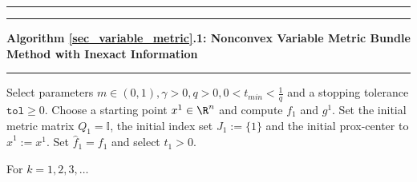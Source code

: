 \begin{minipage}\linewidth
\vspace{1em}
\hrule  \vspace{0.4ex} \hrule
\vspace{1ex}
\textbf{Algorithm \ref{sec_variable_metric}.1: Nonconvex Variable Metric Bundle Method with Inexact Information}
\vspace{1ex}
\hrule
\vspace{1ex}
Select parameters \( m \in (0,1), \gamma > 0, q > 0, 0 < t_{min} < \frac{1}{q} \) and a stopping tolerance \( \mathtt{tol} \geq 0\). Choose a starting point \(x^1 \in \R^n\) and compute \(f_1\) and \(g^1\). Set the initial metric matrix \(Q_1 = \mathbb{I}\), the initial index set \(J_1:=\{1\}\) and the initial prox-center to \(\hat{x}^1 := x^1\). Set \(\hat{f}_1 = f_1\) and select \(t_1 > 0\).
\end{minipage}

For \(k = 1,2,3,  \dotsc \)   

